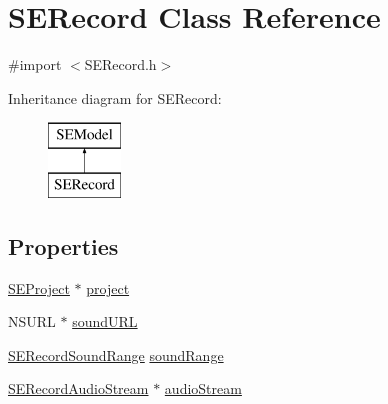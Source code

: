 \hypertarget{interface_s_e_record}{\section{S\-E\-Record Class Reference}
\label{interface_s_e_record}
}


{\ttfamily \#import $<$S\-E\-Record.\-h$>$}

Inheritance diagram for S\-E\-Record\-:\begin{figure}[H]
\begin{center}
\leavevmode
\includegraphics[height=2.000000cm]{interface_s_e_record}
\end{center}
\end{figure}
\subsection*{Properties}
\begin{DoxyCompactItemize}
\item 
\hyperlink{interface_s_e_project}{S\-E\-Project} $\ast$ \hyperlink{interface_s_e_record_a6051966cb1a3a4f0dcf0e3963fc9d129}{project}
\item 
N\-S\-U\-R\-L $\ast$ \hyperlink{interface_s_e_record_a797e448b073754b26502fce4bc47585c}{sound\-U\-R\-L}
\item 
\hyperlink{struct_s_e_record_sound_range}{S\-E\-Record\-Sound\-Range} \hyperlink{interface_s_e_record_a4d80553d0b2ad098f0bb2555bd5fea35}{sound\-Range}
\item 
\hyperlink{interface_s_e_record_audio_stream}{S\-E\-Record\-Audio\-Stream} $\ast$ \hyperlink{interface_s_e_record_a91d05afe5637ae3b715c600c12a78bfb}{audio\-Stream}
\end{DoxyCompactItemize}


